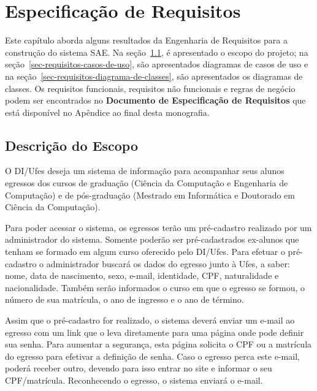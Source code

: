 
\chapter{Especificação de Requisitos}
\label{sec-requisitos}

Este capítulo aborda alguns resultados da Engenharia de Requisitos para a construção do sistema SAE. Na seção~\ref{sec-requisitos-escopo}, é apresentado o escopo do projeto; na seção~\ref{sec-requisitos-casos-de-uso}, são apresentados diagramas de casos de uso e na seção~\ref{sec-requisitos-diagrama-de-classes}, são apresentados os diagramas de classes. Os requisitos funcionais, requisitos não funcionais e regras de negócio podem ser encontrados no \textbf{Documento de Especificação de Requisitos} que está disponível no Apêndice ao final desta monografia.


\section{Descrição do Escopo}
\label{sec-requisitos-escopo}

O DI/Ufes deseja um sistema de informação para acompanhar seus alunos egressos dos cursos de graduação (Ciência da Computação e Engenharia de Computação) e de pós-graduação (Mestrado em Informática e Doutorado em Ciência da Computação). 

Para poder acessar o sistema, os egressos terão um pré-cadastro realizado por um administrador do sistema. Somente poderão ser pré-cadastrados ex-alunos que tenham se formado em algum curso oferecido pelo DI/Ufes. Para efetuar o pré-cadastro o administrador buscará os dados do egresso junto à Ufes, a saber: nome, data de nascimento, sexo, e-mail, identidade, CPF, naturalidade e nacionalidade. Também serão informados o curso em que o egresso se formou, o número de sua matrícula, o ano de ingresso e o ano de término. 

Assim que o pré-cadastro for realizado, o sistema deverá enviar um e-mail ao egresso com um link que o leva diretamente para uma página onde pode definir sua senha. Para aumentar a segurança, esta página solicita o CPF ou a matrícula do egresso para efetivar a definição de senha. Caso o egresso perca este e-mail, poderá receber outro, devendo para isso entrar no site e informar o seu CPF/matrícula. Reconhecendo o egresso, o sistema enviará o e-mail.
 
